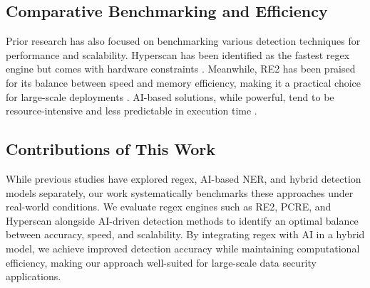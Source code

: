 \subsection{Comparative Benchmarking and Efficiency}
Prior research has also focused on benchmarking various detection techniques for performance and scalability. Hyperscan has been identified as the fastest regex engine but comes with hardware constraints \cite{wang2019hyperscan}. Meanwhile, RE2 has been praised for its balance between speed and memory efficiency, making it a practical choice for large-scale deployments \cite{pike2010re2}. AI-based solutions, while powerful, tend to be resource-intensive and less predictable in execution time \cite{strubell2020energy}.

\subsection{Contributions of This Work}
While previous studies have explored regex, AI-based NER, and hybrid detection models separately, our work systematically benchmarks these approaches under real-world conditions. We evaluate regex engines such as RE2, PCRE, and Hyperscan alongside AI-driven detection methods to identify an optimal balance between accuracy, speed, and scalability. By integrating regex with AI in a hybrid model, we achieve improved detection accuracy while maintaining computational efficiency, making our approach well-suited for large-scale data security applications.
